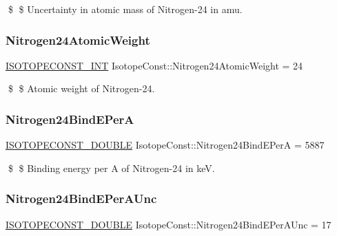 \$ \$ Uncertainty in atomic mass of Nitrogen-\/24 in amu. \mbox{\label{group___isotope_const-_nitrogen-_n24_ga493934ec4956fcd91460e67b84bdf3ef}} 
\subsubsection{\texorpdfstring{Nitrogen24\+Atomic\+Weight}{Nitrogen24AtomicWeight}}
{\footnotesize\ttfamily \mbox{\hyperlink{group___isotope_const-_macros_ga5f18360b3e99483a35c32d789e62621c}{I\+S\+O\+T\+O\+P\+E\+C\+O\+N\+S\+T\+\_\+\+I\+NT}} Isotope\+Const\+::\+Nitrogen24\+Atomic\+Weight = 24}

\$ \$ Atomic weight of Nitrogen-\/24. \mbox{\label{group___isotope_const-_nitrogen-_n24_ga9cdaaf0aa2477da136f3c7c8e874ab4a}} 
\subsubsection{\texorpdfstring{Nitrogen24\+Bind\+E\+PerA}{Nitrogen24BindEPerA}}
{\footnotesize\ttfamily \mbox{\hyperlink{group___isotope_const-_macros_ga8f45a7272ce02c0b4c65c44636ed719a}{I\+S\+O\+T\+O\+P\+E\+C\+O\+N\+S\+T\+\_\+\+D\+O\+U\+B\+LE}} Isotope\+Const\+::\+Nitrogen24\+Bind\+E\+PerA = 5887}

\$ \$ Binding energy per A of Nitrogen-\/24 in keV. \mbox{\label{group___isotope_const-_nitrogen-_n24_ga562bf7d1c3e4b94ac3ebb5ba6f5abd37}} 
\subsubsection{\texorpdfstring{Nitrogen24\+Bind\+E\+Per\+A\+Unc}{Nitrogen24BindEPerAUnc}}
{\footnotesize\ttfamily \mbox{\hyperlink{group___isotope_const-_macros_ga8f45a7272ce02c0b4c65c44636ed719a}{I\+S\+O\+T\+O\+P\+E\+C\+O\+N\+S\+T\+\_\+\+D\+O\+U\+B\+LE}} Isotope\+Const\+::\+Nitrogen24\+Bind\+E\+Per\+A\+Unc = 17}

